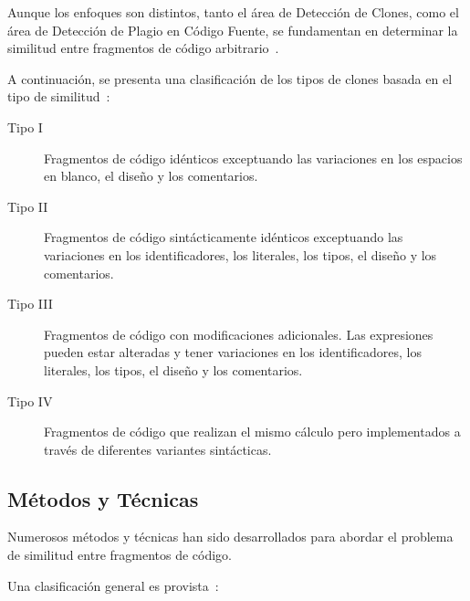 Aunque los enfoques son distintos,
tanto el área de Detección de Clones,
como el área de Detección de Plagio en Código Fuente,
se fundamentan en determinar la similitud entre fragmentos de código arbitrario~\cite{Beth2014ACO}.

A continuación, se presenta una clasificación de los tipos de clones
basada en el tipo de similitud~\cite{Roy07asurvey}:

\begin{description}
  \item [Tipo I] Fragmentos de código idénticos exceptuando las variaciones en los espacios en blanco, el diseño y los comentarios.
  \item [Tipo II] Fragmentos de código sintácticamente idénticos exceptuando las variaciones en los identificadores, los literales, los tipos, el diseño y los comentarios.
  \item [Tipo III] Fragmentos de código con modificaciones adicionales. Las expresiones pueden estar alteradas y tener variaciones en los identificadores, los literales, los tipos, el diseño y los comentarios.
  \item [Tipo IV] Fragmentos de código que realizan el mismo cálculo pero implementados a través de diferentes variantes sintácticas.
\end{description}

\newpage
\subsection{Métodos y Técnicas}

Numerosos métodos y técnicas han sido desarrollados para abordar
el problema de similitud entre fragmentos de código.

Una clasificación general es provista~\cite{Roy07asurvey}:

